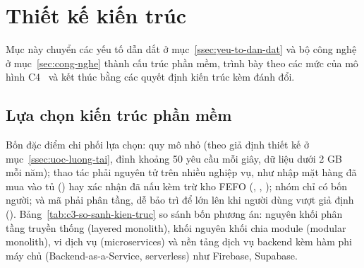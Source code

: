 \section{Thiết kế kiến trúc}\label{sec:kien-truc}

Mục này chuyển các yếu tố dẫn dắt ở mục~\ref{ssec:yeu-to-dan-dat} và bộ công nghệ ở mục~\ref{sec:cong-nghe} thành cấu trúc phần mềm, trình bày theo các mức của mô hình C4~\cite{c4model} và kết thúc bằng các quyết định kiến trúc kèm đánh đổi.

\subsection{Lựa chọn kiến trúc phần mềm}\label{ssec:lua-chon-kien-truc}

Bốn đặc điểm chi phối lựa chọn: quy mô nhỏ (theo giả định thiết kế ở mục~\ref{ssec:uoc-luong-tai}, đỉnh khoảng 50 yêu cầu mỗi giây, dữ liệu dưới 2 GB mỗi năm); thao tác phải nguyên tử trên nhiều nghiệp vụ, như nhập mặt hàng đã mua vào tủ () hay xác nhận đã nấu kèm trừ kho FEFO (, , ); nhóm chỉ có bốn người; và mã phải phân tầng, dễ bảo trì để lớn lên khi người dùng vượt giả định (). Bảng~\ref{tab:c3-so-sanh-kien-truc} so sánh bốn phương án: nguyên khối phân tầng truyền thống (layered monolith), khối nguyên khối chia module (modular monolith), vi dịch vụ (microservices) và nền tảng dịch vụ backend kèm hàm phi máy chủ (Backend-as-a-Service, serverless) như Firebase, Supabase.

